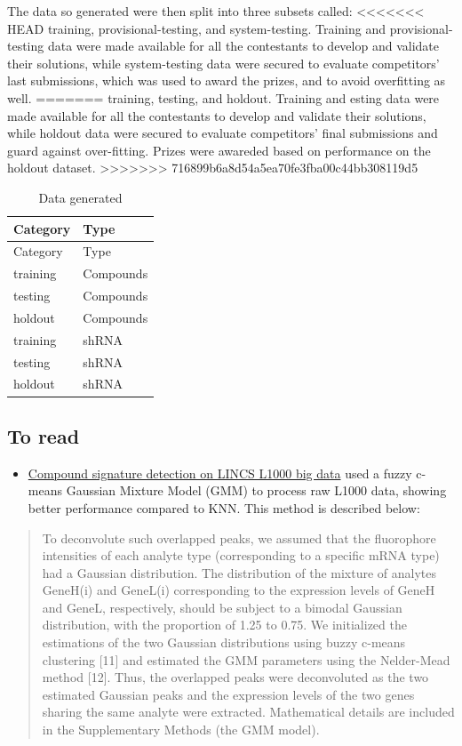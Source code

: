\documentclass[]{article}
\providecommand{\tightlist}{%
  \setlength{\itemsep}{0pt}\setlength{\parskip}{0pt}}
\begin{document}
The data so generated were then split into three subsets called:
<<<<<<< HEAD
training, provisional-testing, and system-testing. Training and
provisional-testing data were made available for all the contestants to
develop and validate their solutions, while system-testing data were
secured to evaluate competitors' last submissions, which was used to
award the prizes, and to avoid overfitting as well.
=======
training, testing, and holdout. Training and esting data were made
available for all the contestants to develop and validate their
solutions, while holdout data were secured to evaluate competitors'
final submissions and guard against over-fitting. Prizes were awareded
based on performance on the holdout dataset.
>>>>>>> 716899b6a8d54a5ea70fe3fba00c44bb308119d5

\begin{longtable}[]{@{}ll@{}}
\caption{Data generated}\tabularnewline
\toprule
Category & Type\tabularnewline
\midrule
\endfirsthead
\toprule
Category & Type\tabularnewline
\midrule
\endhead
training & Compounds\tabularnewline
testing & Compounds\tabularnewline
holdout & Compounds\tabularnewline
training & shRNA\tabularnewline
testing & shRNA\tabularnewline
holdout & shRNA\tabularnewline
\bottomrule
\end{longtable}

\hypertarget{to-read}{%
\subsection{To read}\label{to-read}}

\begin{itemize}
\tightlist
\item
  \href{https://pubs.rsc.org/en/content/getauthorversionpdf/c4mb00677a}{Compound
  signature detection on LINCS L1000 big data} used a fuzzy c-means
  Gaussian Mixture Model (GMM) to process raw L1000 data, showing better
  performance compared to KNN. This method is described below:
\end{itemize}

\begin{quote}
To deconvolute such overlapped peaks, we assumed that the fluorophore
intensities of each analyte type (corresponding to a specific mRNA type)
had a Gaussian distribution. The distribution of the mixture of analytes
GeneH(i) and GeneL(i) corresponding to the expression levels of GeneH
and GeneL, respectively, should be subject to a bimodal Gaussian
distribution, with the proportion of 1.25 to 0.75. We initialized the
estimations of the two Gaussian distributions using buzzy c-means
clustering {[}11{]} and estimated the GMM parameters using the
Nelder-Mead method {[}12{]}. Thus, the overlapped peaks were
deconvoluted as the two estimated Gaussian peaks and the expression
levels of the two genes sharing the same analyte were extracted.
Mathematical details are included in the Supplementary Methods (the GMM
model).
\end{quote}
\end{document}
